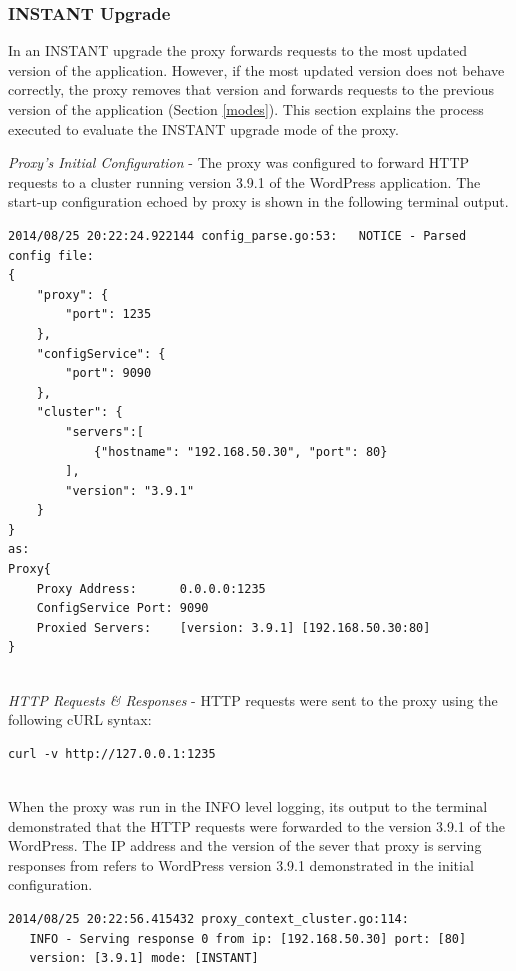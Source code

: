 \documentclass[a4paper,11pt,twoside]{report}
\begin{document}
\subsubsection*{INSTANT Upgrade}
In an INSTANT upgrade the proxy  forwards requests to the most updated version of the application. However, if the most updated version does not behave correctly, the proxy removes that version and forwards requests to the previous version of the application (Section \ref{modes}). This section explains the process executed to evaluate the INSTANT upgrade mode of the proxy.\medskip

\noindent
\textit{Proxy's Initial Configuration} - The proxy was configured to forward HTTP requests to a cluster running version 3.9.1 of the WordPress application. The start-up configuration echoed by proxy is shown in the following terminal output.\smallskip

\begin{lstlisting}[language=terminal]
2014/08/25 20:22:24.922144 config_parse.go:53:   NOTICE - Parsed config file:
{
    "proxy": {
        "port": 1235
    },
    "configService": {
        "port": 9090
    },
    "cluster": {
        "servers":[
            {"hostname": "192.168.50.30", "port": 80}
        ],
        "version": "3.9.1"
    }
}
as:
Proxy{
	Proxy Address:      0.0.0.0:1235
	ConfigService Port: 9090
	Proxied Servers:    [version: 3.9.1] [192.168.50.30:80]
}   
\end{lstlisting}

\noindent \\
\textit{HTTP Requests \& Responses} - HTTP requests were sent to the proxy using the following cURL syntax:\smallskip
\begin{lstlisting}[language=terminal] 
curl -v http://127.0.0.1:1235 
\end{lstlisting} 

\noindent\\
When the proxy was run in the INFO level logging, its output to the terminal demonstrated that the HTTP requests were forwarded to the version 3.9.1 of the WordPress. The IP address and the version of the sever that proxy is serving responses from refers to WordPress version 3.9.1 demonstrated in the initial configuration.\smallskip

\begin{lstlisting}[language=terminal] 
2014/08/25 20:22:56.415432 proxy_context_cluster.go:114:     
   INFO - Serving response 0 from ip: [192.168.50.30] port: [80] 
   version: [3.9.1] mode: [INSTANT]
\end{lstlisting} 
\end{document}

